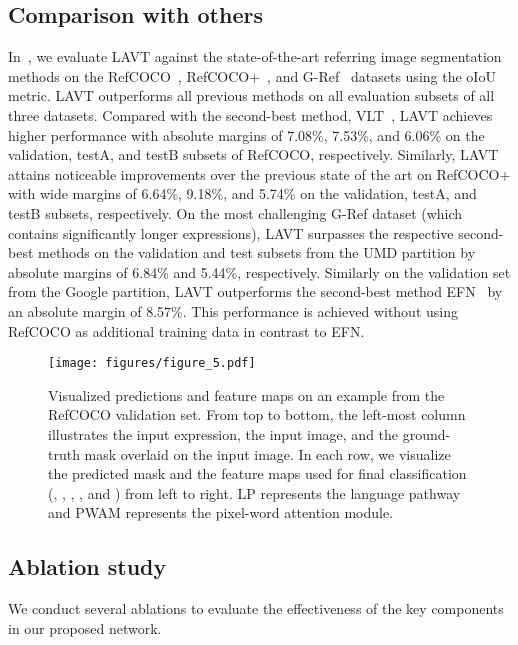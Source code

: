 \documentclass[10pt,twocolumn,letterpaper]{article}
\begin{document}
\subsection{Comparison with others}
\label{sec:comparison_w_others}
In~, we evaluate LAVT against the state-of-the-art referring image segmentation methods on the RefCOCO~\cite{yu2016modeling}, RefCOCO+~\cite{yu2016modeling}, and G-Ref~\cite{mao2015generation,nagaraja16refexp} datasets using the oIoU metric.
LAVT outperforms all previous methods on all evaluation subsets of all three datasets.
Compared with the second-best method, VLT~\cite{Ding_2021_vlt}, LAVT achieves higher performance with absolute margins of 7.08\%, 7.53\%, and 6.06\% on the validation, testA, and testB subsets of RefCOCO, respectively.
Similarly, LAVT attains noticeable improvements over the previous state of the art on RefCOCO+ with wide margins of 6.64\%, 9.18\%, and 5.74\% on the validation, testA, and testB subsets, respectively.
On the most challenging G-Ref dataset (which contains significantly longer expressions), LAVT surpasses the respective second-best methods on the validation and test subsets from the UMD partition by absolute margins of 6.84\% and 5.44\%, respectively.
Similarly on the validation set from the Google partition, LAVT outperforms the second-best method EFN~\cite{EFN} by an absolute margin of 8.57\%.
This performance is achieved without using RefCOCO as additional training data in contrast to EFN.


\begin{figure*}[t]
\centering
\texttt{[image: figures/figure\_5.pdf]}
\caption{Visualized predictions and feature maps on an example from the RefCOCO validation set. From top to bottom, the left-most column illustrates the input expression, the input image, and the ground-truth mask overlaid on the input image. In each row, we visualize the predicted mask and the feature maps used for final classification (\ie, , , , and ) from left to right. LP represents the language pathway and PWAM represents the pixel-word attention module.}
\label{fig:5}
\end{figure*}


\subsection{Ablation study}
\label{sec:ablation_study}
We conduct several ablations to evaluate the effectiveness of the key components in our proposed network.
\end{document}
